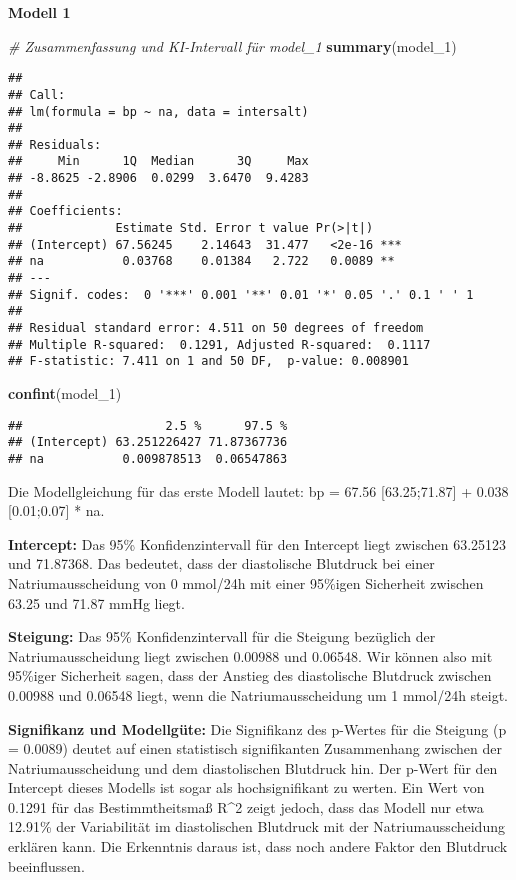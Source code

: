 \documentclass[
]{article}
\newenvironment{Shaded}{\begin{snugshade}}{\end{snugshade}}
\newcommand{\CommentTok}[1]{\textcolor[rgb]{0.56,0.35,0.01}{\textit{#1}}}
\newcommand{\FunctionTok}[1]{\textcolor[rgb]{0.13,0.29,0.53}{\textbf{#1}}}
\newcommand{\NormalTok}[1]{#1}
\begin{document}
\textbf{Modell 1}

\begin{Shaded}
\begin{Highlighting}[]
\CommentTok{\# Zusammenfassung und KI{-}Intervall für model\_1}
\FunctionTok{summary}\NormalTok{(model\_1)}
\end{Highlighting}
\end{Shaded}

\begin{verbatim}
## 
## Call:
## lm(formula = bp ~ na, data = intersalt)
## 
## Residuals:
##     Min      1Q  Median      3Q     Max 
## -8.8625 -2.8906  0.0299  3.6470  9.4283 
## 
## Coefficients:
##             Estimate Std. Error t value Pr(>|t|)    
## (Intercept) 67.56245    2.14643  31.477   <2e-16 ***
## na           0.03768    0.01384   2.722   0.0089 ** 
## ---
## Signif. codes:  0 '***' 0.001 '**' 0.01 '*' 0.05 '.' 0.1 ' ' 1
## 
## Residual standard error: 4.511 on 50 degrees of freedom
## Multiple R-squared:  0.1291, Adjusted R-squared:  0.1117 
## F-statistic: 7.411 on 1 and 50 DF,  p-value: 0.008901
\end{verbatim}

\begin{Shaded}
\begin{Highlighting}[]
\FunctionTok{confint}\NormalTok{(model\_1)}
\end{Highlighting}
\end{Shaded}

\begin{verbatim}
##                    2.5 %      97.5 %
## (Intercept) 63.251226427 71.87367736
## na           0.009878513  0.06547863
\end{verbatim}

Die Modellgleichung für das erste Modell lautet: bp = 67.56
{[}63.25;71.87{]} + 0.038 {[}0.01;0.07{]} * na.

\textbf{Intercept:} Das 95\% Konfidenzintervall für den Intercept liegt
zwischen 63.25123 und 71.87368. Das bedeutet, dass der diastolische
Blutdruck bei einer Natriumausscheidung von 0 mmol/24h mit einer
95\%igen Sicherheit zwischen 63.25 und 71.87 mmHg liegt.

\textbf{Steigung:} Das 95\% Konfidenzintervall für die Steigung
bezüglich der Natriumausscheidung liegt zwischen 0.00988 und 0.06548.
Wir können also mit 95\%iger Sicherheit sagen, dass der Anstieg des
diastolische Blutdruck zwischen 0.00988 und 0.06548 liegt, wenn die
Natriumausscheidung um 1 mmol/24h steigt.

\textbf{Signifikanz und Modellgüte:} Die Signifikanz des p-Wertes für
die Steigung (p = 0.0089) deutet auf einen statistisch signifikanten
Zusammenhang zwischen der Natriumausscheidung und dem diastolischen
Blutdruck hin. Der p-Wert für den Intercept dieses Modells ist sogar als
hochsignifikant zu werten. Ein Wert von 0.1291 für das Bestimmtheitsmaß
R\^{}2 zeigt jedoch, dass das Modell nur etwa 12.91\% der Variabilität
im diastolischen Blutdruck mit der Natriumausscheidung erklären kann.
Die Erkenntnis daraus ist, dass noch andere Faktor den Blutdruck
beeinflussen.
\end{document}
